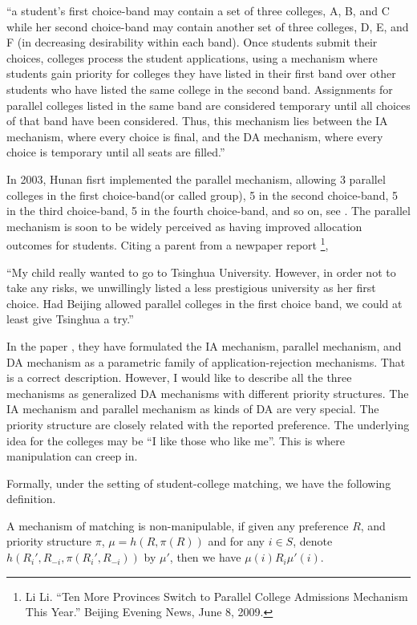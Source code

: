 ``a student’s first choice-band may
contain a set of three colleges, A, B, and C while her second choice-band may contain another set
of three colleges, D, E, and F (in decreasing desirability within each band). Once students submit
their choices, colleges process the student applications, using a mechanism where students gain
priority for colleges they have listed in their first band over other students who have listed the same
college in the second band. Assignments for parallel colleges listed in the same band are considered
temporary until all choices of that band have been considered. Thus, this mechanism lies between
the IA mechanism, where every choice is final, and the DA mechanism, where every choice is
temporary until all seats are filled.''

In 2003, Hunan fisrt implemented the parallel mechanism, allowing 3
parallel colleges in the first choice-band(or called group), 5 in the second choice-band, 5 in the third choice-band, 5 in the fourth choice-band, and so on, see \parencite{YanChenJPE}.  The parallel mechanism is soon to be widely perceived as having improved allocation outcomes for students. Citing a parent from a newpaper report \footnote{Li Li. “Ten More Provinces Switch to Parallel College Admissions Mechanism This Year.” Beijing Evening News,
June 8, 2009.},

``My child really wanted to go to Tsinghua University. However,  in order not to
take any risks, we unwillingly listed a less prestigious university as her first choice.
Had Beijing allowed parallel colleges in the first choice band, we could at least give
Tsinghua a try.''

 In the paper  \parencite{YanChenJPE}, they have formulated the IA
 mechanism, parallel mechanism, and DA mechanism as a parametric
 family of application-rejection mechanisms. That is a correct
 description. However, I would like to describe all the three mechanisms
 as generalized DA mechanisms with different priority structures. The IA mechanism
 and parallel mechanism as kinds of DA are very special. The priority
 structure are closely related with the  reported
 preference. The underlying idea for the colleges may be ``I like
 those who like me''. This is where manipulation can creep in.

Formally, under the setting of student-college matching, we have the following definition.

\begin{definition}
A mechanism of matching is non-manipulable, if given any preference
$R$, and priority structure $\pi$, $\mu = h(R, \pi(R))$ and for any $i
\in S$, denote $h(R_i',R_{-i}, \pi(R_i',R_{-i}))$ by $\mu'$, then we have $\mu(i)R_i \mu'(i)$.
\end{definition}

